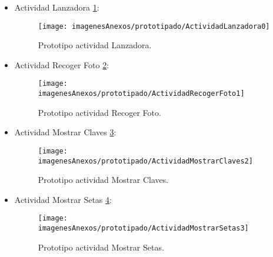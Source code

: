 \begin{itemize}

	
	\item Actividad Lanzadora \ref{figActividadLanzadora0}:
	\begin{figure}[h]
    	\begin{center}%
        	\begin{center}%
          	\texttt{[image: imagenesAnexos/prototipado/ActividadLanzadora0]}%
          	\caption{Prototipo actividad Lanzadora.}%
          	\label{figActividadLanzadora0}%
        	\end{center}%
  		\end{center}%
	\end{figure}%
	\clearpage
	
	\item Actividad Recoger Foto \ref{figActividadRecogerFoto1}:
	\begin{figure}[h]
    	\begin{center}%
        	\begin{center}%
          	\texttt{[image: imagenesAnexos/prototipado/ActividadRecogerFoto1]}%
          	\caption{Prototipo actividad Recoger Foto.}%
          	\label{figActividadRecogerFoto1}%
        	\end{center}%
  		\end{center}%
	\end{figure}%
	\clearpage
	
	\item Actividad Mostrar Claves \ref{figActividadMostrarClaves2}:
	\begin{figure}[h]
    	\begin{center}%
        	\begin{center}%
          	\texttt{[image: imagenesAnexos/prototipado/ActividadMostrarClaves2]}%
          	\caption{Prototipo actividad Mostrar Claves.}%
          	\label{figActividadMostrarClaves2}%
        	\end{center}%
  		\end{center}%
	\end{figure}%
	\clearpage
	
	
	\item Actividad Mostrar Setas \ref{figActividadMostrarSetas3}:
	\begin{figure}[h]
    	\begin{center}%
        	\begin{center}%
          	\texttt{[image: imagenesAnexos/prototipado/ActividadMostrarSetas3]}%
          	\caption{Prototipo actividad Mostrar Setas.}%
          	\label{figActividadMostrarSetas3}%
        	\end{center}%
  		\end{center}%
	\end{figure}%
	\clearpage
	

\end{itemize}
